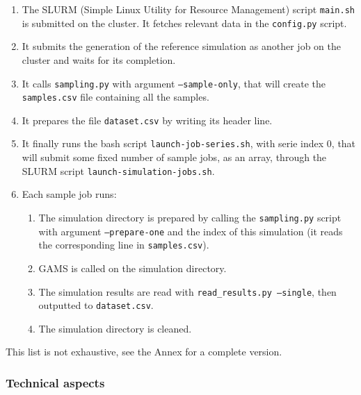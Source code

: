 \begin{enumerate}
    \item The SLURM (Simple Linux Utility for Resource Management) script \texttt{main.sh} is submitted on the cluster. It fetches relevant data in the \texttt{config.py} script.
    \item It submits the generation of the reference simulation as another job on the cluster and waits for its completion.
    \item It calls \texttt{sampling.py} with argument \texttt{--sample-only}, that will create the \texttt{samples.csv} file containing all the samples.
    \item It prepares the file \texttt{dataset.csv} by writing its header line.
    \item It finally runs the bash script \texttt{launch-job-series.sh}, with serie index 0, that will submit some fixed number of sample jobs, as an array, through the SLURM script \texttt{launch-simulation-jobs.sh}.
    \item Each sample job runs:
    \begin{enumerate}
        \item The simulation directory is prepared by calling the \texttt{sampling.py} script with argument \texttt{--prepare-one} and the index of this simulation (it reads the corresponding line in \texttt{samples.csv}).
        \item GAMS is called on the simulation directory.
        \item The simulation results are read with \texttt{read\_results.py --single}, then outputted to \texttt{dataset.csv}.
        \item The simulation directory is cleaned.
    \end{enumerate}
\end{enumerate}

This list is not exhaustive, see the Annex for a complete version.

\subsubsection{Technical aspects}

